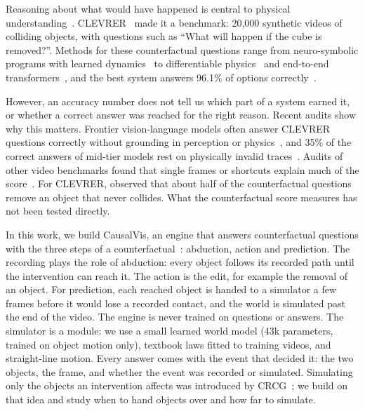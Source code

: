 \IfFileExists{TMLR}{\documentclass[10pt]{article}}%
\providecommand{\etal}{et al.}
\newcommand{\namecite}[2]{\citet{#2}}
\newcommand{\namecite}[2]{#1 \etal~\oldcitecompat{#2}}
\newcommand{\oldcitecompat}[1]{\cite{#1}}
\newcommand{\sys}{CausalVis}
\begin{document}
Reasoning about what would have happened is central to physical understanding~\cite{battaglia2013simulation,gerstenberg2021csm}.
CLEVRER~\cite{yi2020clevrer} made it a benchmark: 20,000 synthetic videos of colliding objects, with questions such as ``What will happen if the cube is removed?''.
Methods for these counterfactual questions range from neuro-symbolic programs with learned dynamics~\cite{yi2020clevrer,chen2021dcl} to differentiable physics~\cite{ding2021vrdp} and end-to-end transformers~\cite{ding2021aloe}, and the best system answers 96.1\% of options correctly~\cite{ishay2024crcg}.

However, an accuracy number does not tell us which part of a system earned it, or whether a correct answer was reached for the right reason.
Recent audits show why this matters.
Frontier vision-language models often answer CLEVRER questions correctly without grounding in perception or physics~\cite{bagdonaviciute2025physics}, and 35\% of the correct answers of mid-tier models rest on physically invalid traces~\cite{bourigault2026words}.
Audits of other video benchmarks found that single frames or shortcuts explain much of the score~\cite{buch2022revisiting,krojer2025mvp,radsch2026verified}.
For CLEVRER, \namecite{Ding}{ding2021aloe} observed that about half of the counterfactual questions remove an object that never collides.
What the counterfactual score measures has not been tested directly.

In this work, we build \sys{}, an engine that answers counterfactual questions with the three steps of a counterfactual~\cite{pearl2009causality}: abduction, action and prediction.
The recording plays the role of abduction: every object follows its recorded path until the intervention can reach it.
The action is the edit, for example the removal of an object.
For prediction, each reached object is handed to a simulator a few frames before it would lose a recorded contact, and the world is simulated past the end of the video.
The engine is never trained on questions or answers.
The simulator is a module: we use a small learned world model (43k parameters, trained on object motion only), textbook laws fitted to training videos, and straight-line motion.
Every answer comes with the event that decided it: the two objects, the frame, and whether the event was recorded or simulated.
Simulating only the objects an intervention affects was introduced by CRCG~\cite{ishay2024crcg}; we build on that idea and study when to hand objects over and how far to simulate.
\end{document}
